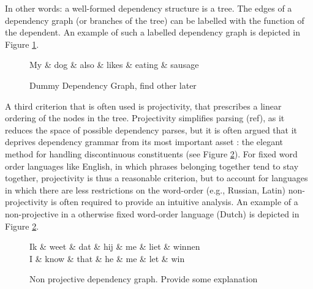\documentclass{report}
\theoremstyle{definition}
\theoremstyle{plain}
\begin{document}
In other words: a well-formed dependency structure is a tree. The edges of a dependency graph (or branches of the tree) can be labelled with the function of the dependent. An example of such a labelled dependency graph is depicted in Figure \ref{fig:depgraph}.

\begin{figure}
\centering
\begin{dependency}[theme=simple]%
\begin{deptext}[column sep=.5cm, row sep=.1ex]
My \& dog \& also \& likes \& eating \& sausage \\
\end{deptext}
\end{dependency}
\caption{Dummy Dependency Graph, find other later}\label{fig:depgraph}
\end{figure}

A third criterion that is often used is projectivity, that prescribes a linear ordering of the nodes in the tree. Projectivity simplifies parsing (ref), as it reduces the space of possible dependency parses, but it is often argued that it deprives dependency grammar from its most important asset \citep{covington1990dependency,debusmann2000introduction}: the elegant method for handling discontinuous constituents (see Figure \ref{fig:npdeptree}). For fixed word order languages like English, in which phrases belonging together tend to stay together, projectivity is thus a reasonable criterion, but to account for languages in which there are less restrictions on the word-order (e.g., Russian, Latin) non-projectivity is often required to provide an intuitive analysis. An example of a non-projective in a otherwise fixed word-order language (Dutch) is depicted in Figure \ref{fig:npdeptree}.

\begin{figure}\label{fig:npdeptree}
\centering
\begin{dependency}[theme=simple]%
\begin{deptext}[column sep=.5cm, row sep=.1ex]
Ik \& weet \& dat \& hij \& me \& liet \& winnen\\
\tiny{I} \& \tiny{know} \& \tiny{that} \& \tiny{he} \& \tiny{me} \& \tiny{let} \& \tiny{win}\\
\end{deptext}
\end{dependency}
\caption{Non projective dependency graph. Provide some explanation}
\end{figure}
\end{document}
